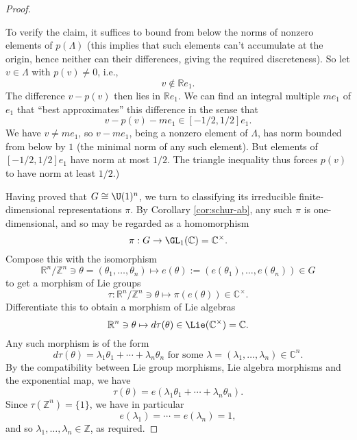 \documentclass[reqno]{amsart} 
\begin{document}
\begin{proof}
\begin{enumerate}
    To verify the claim, it suffices to bound from below the norms of nonzero elements of $p(\Lambda)$ (this implies that such elements can't accumulate at the origin, hence neither can their differences, giving the required discreteness).  So let $v \in \Lambda$ with $p(v) \neq 0$, i.e.,
    \begin{equation*}
      v \notin \mathbb{R} e_1.
    \end{equation*}
    The difference $v - p(v)$ then lies in $\mathbb{R} e_1$.  We can find an integral multiple $m e_1$ of $e_1$ that ``best approximates'' this difference in the sense that
    \begin{equation*}
v - p(v) - m e_1 \in [-1/2,1/2] e_1.
\end{equation*}
 We have $v \neq m e_1$, so $v - m e_1$, being a nonzero element of $\Lambda$, has norm bounded from below by $1$ (the minimal norm of any such element).  But elements of $[-1/2,1/2] e_1$ have norm at most $1/2$.  The triangle inequality thus forces $p(v)$ to have norm at least $1/2$.)
  \end{enumerate}
  Having proved that $G \cong \U(1)^n$, we turn to classifying its irreducible finite-dimensional representations $\pi$.  By Corollary \ref{cor:schur-ab}, any such $\pi$ is one-dimensional, and so may be regarded as a homomorphism
  \begin{equation}\label{eq:}
    \pi : G \rightarrow \GL_1(\mathbb{C}) = \mathbb{C}^\times.
  \end{equation}
  Compose this with the isomorphism
  \begin{equation}\label{eq:}
    \mathbb{R}^n/\mathbb{Z}^n \ni \theta = (\theta_1,\dotsc,\theta_n) \mapsto
    e(\theta)  := (e(\theta_1),\dotsc,e(\theta_n)) \in G
  \end{equation}
  to get a morphism of Lie groups
  \begin{equation}\label{eq:}
    \tau : \mathbb{R}^n/\mathbb{Z}^n
    \ni \theta \mapsto \pi(e(\theta)) \in \mathbb{C}^\times.
  \end{equation}
  Differentiate this to obtain a morphism of Lie algebras
  \begin{equation}\label{eq:}
    \mathbb{R}^n \ni \theta \mapsto d \tau(\theta) \in \Lie(\mathbb{C}^\times) = \mathbb{C}.
  \end{equation}
  Any such morphism is of the form
  \begin{equation*}
    d \tau(\theta) = \lambda_1 \theta_1 + \dotsb + \lambda_n \theta_n \text{ for some $\lambda = (\lambda_1,\dotsc,\lambda_n) \in \mathbb{C}^n$.}
  \end{equation*}
  By the compatibility between Lie group morphisms, Lie algebra morphisms and the exponential map, we have
  \begin{equation*}
    \tau(\theta) = e(\lambda_1 \theta_1 + \dotsb + \lambda_n \theta_n).
  \end{equation*}
  Since $\tau(\mathbb{Z}^n) = \{1\}$, we have in particular
  \begin{equation}\label{eq:}
    e(\lambda_1) = \dotsb = e(\lambda_n) = 1,
  \end{equation}
  and so $\lambda_1,\dotsc,\lambda_n \in \mathbb{Z}$, as required.
  

\end{proof}
\end{document}
